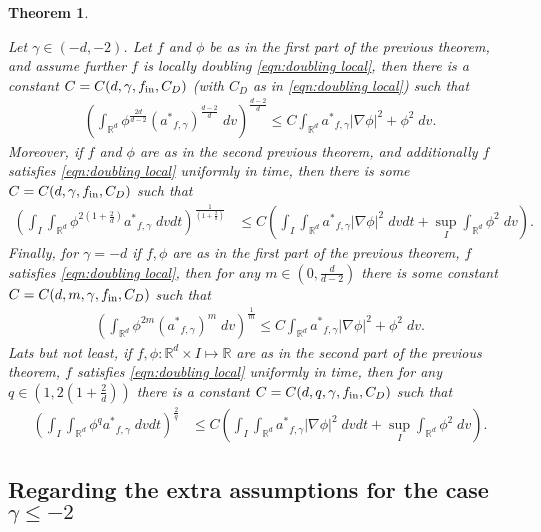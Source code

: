 \documentclass[12pt,american]{amsart}
\numberwithin{equation}{section}
\theoremstyle{plain}
\newtheorem{thm}{Theorem}[section]
\theoremstyle{definition}                  %
\def\astar{{a^*}}
\def\fin{f_{\textnormal{in}}}
\begin{document}
\begin{thm}\label{thm:Inequalities Sobolev weight gamma below -2}
	   
   Let  $\gamma \in (-d,-2)$. Let $f$ and $\phi$ be as in the first part of the previous theorem, and assume further $f$ is locally doubling \eqref{eqn:doubling local}, then there is a constant $C = C(d,\gamma,\fin,C_D)$ (with $C_D$ as in \eqref{eqn:doubling local}) such that
   \begin{align*}
      \left ( \int_{\mathbb{R}^d}  \phi^{\frac{2d}{d-2}}(\astar_{f,\gamma})^{\frac{d-2}{d}} \;dv\right )^{\frac{d-2}{d}}\leq C\int_{\mathbb{R}^d} \astar_{f,\gamma} |\nabla \phi|^2+\phi^2\;dv.		
    \end{align*}			
    Moreover, if $f$ and $\phi$ are as in the second previous theorem, and additionally $f$ satisfies \eqref{eqn:doubling local} uniformly in time, then there is some $C=C(d,\gamma,\fin,C_D)$ such that
      \begin{align*}
     \left ( \int_{I}\int_{\mathbb{R}^d} \phi^{2(1+\frac{2}{d})} \astar_{f,\gamma} \;dvdt \right )^{\frac{1}{(1+\frac{2}{d})}} & \leq C\left ( \int_{I} \int_{\mathbb{R}^d} \astar_{f,\gamma} |\nabla \phi|^2 \;dvdt +  \sup \limits_{I} \int_{\mathbb{R}^d} \phi^{2}\;dv \right ).
    \end{align*} 
    Finally, for $\gamma=-d$ if $f,\phi$ are as in the first part of the previous theorem, $f$ satisfies \eqref{eqn:doubling local}, then for any $m\in (0,\tfrac{d}{d-2})$ there is some constant $C=C(d,m,\gamma,\fin,C_D)$ such that	 
   \begin{align*}
      \left ( \int_{\mathbb{R}^d}  \phi^{2m}(\astar_{f,\gamma})^{m} \;dv\right )^{\frac{1}{m}}\leq C\int_{\mathbb{R}^d} \astar_{f,\gamma} |\nabla \phi|^2+\phi^2\;dv.		
    \end{align*}			
    Lats but not least, if $f,\phi:\mathbb{R}^d\times I \mapsto \mathbb{R}$ are as in the second part of the previous theorem, $f$ satisfies \eqref{eqn:doubling local} uniformly in time, then for any $q\in (1,2(1+\frac{2}{d}))$ there is a constant $C = C(d,q,\gamma,\fin,C_D)$ such that
    \begin{align*}
     \left ( \int_{I}\int_{\mathbb{R}^d} \phi^{q} \astar_{f,\gamma} \;dvdt \right )^{\frac{2}{q}} & \leq C\left ( \int_{I} \int_{\mathbb{R}^d} \astar_{f,\gamma} |\nabla \phi|^2 \;dvdt +  \sup \limits_{I} \int_{\mathbb{R}^d} \phi^{2}\;dv \right ).
    \end{align*} 
\end{thm}

\subsection{Regarding the extra assumptions for the case $\gamma\leq -2$}\label{sec:discussion of extra assumptions}
\end{document}
